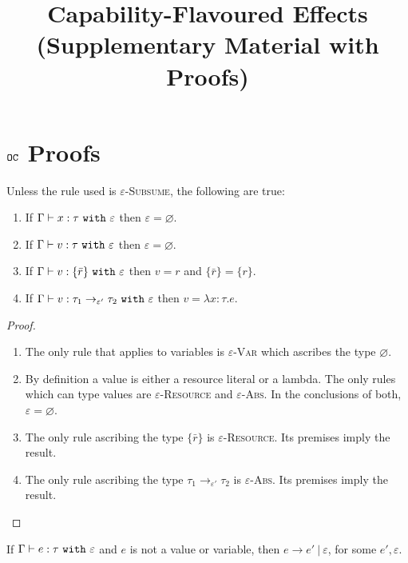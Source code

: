 \documentclass[acmsmall,review,anonymous]{acmart}\settopmatter{printfolios=true}
\begin{document}
\title{Capability-Flavoured Effects (Supplementary Material with Proofs)}


\maketitle


\section{$\mathtt{OC}$ Proofs}


\begin{lemma}
Unless the rule used is \textsc{$\varepsilon$-Subsume}, the following are true:
\begin{enumerate}
	\item If $\Gamma \vdash x: \tau~\mathtt{with}~ \varepsilon$ then $\varepsilon = \varnothing$.
	\item If $ \Gamma \vdash  v:  \tau~\mathtt{with}~ \varepsilon$ then $\varepsilon = \varnothing$.
	\item If $ \Gamma \vdash v: \{ \bar r \}~\mathtt{with}~ \varepsilon$ then $ v = r$ and $\{ \bar r \} = \{ r \}$.
	\item If $\Gamma \vdash v: \tau_1 \rightarrow_{\varepsilon'} \tau_2~\mathtt{with}~ \varepsilon$ then $v = \lambda x:\tau. e$.
\end{enumerate}
\end{lemma}


\begin{proof}
~
\begin{enumerate}
	\item The only rule that applies to variables is \textsc{$\varepsilon$-Var} which ascribes the type $\varnothing$.
	\item By definition a value is either a resource literal or a lambda. The only rules which can type values are \textsc{$\varepsilon$-Resource} and \textsc{$\varepsilon$-Abs}. In the conclusions of both, $\varepsilon = \varnothing$.
	\item The only rule ascribing the type $\{ \bar r \}$ is \textsc{$\varepsilon$-Resource}. Its premises imply the result.
	\item The only rule ascribing the type $\tau_1 \rightarrow_{\varepsilon'} \tau_2$ is \textsc{$\varepsilon$-Abs}. Its premises imply the result.
\end{enumerate}
\end{proof}


\hrulefill


\begin{theorem}
If $ \Gamma \vdash  e:  \tau~\mathtt{with}~ \varepsilon$ and $ e$ is not a value or variable, then $ e \longrightarrow  e'~|~\varepsilon$, for some $e', \varepsilon$.
\end{theorem}
\end{document}
